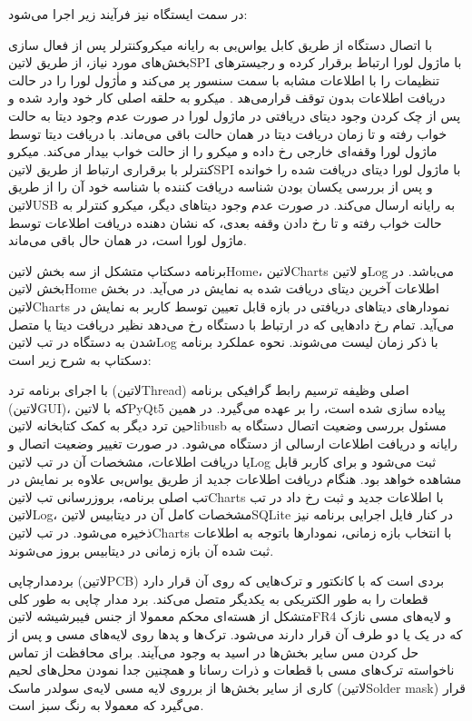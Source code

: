 در سمت ایستگاه نیز فرآیند زیر اجرا می‌شود:

با اتصال دستگاه از طریق کابل یو‌اس‌بی به رایانه میکروکنترلر پس از فعال سازی بخش‌های مورد نیاز، از طریق ‌لاتین{SPI} با ماژول لورا ارتباط برقرار کرده و رجیستر‌های تنظیمات را با اطلاعات مشابه با سمت سنسور پر می‌کند و ماٰژول لورا را در حالت دریافت اطلاعات بدون توقف قرار‌می‌هد .
میکرو به حلقه اصلی کار خود وارد شده و پس از چک کردن وجود دیتای دریافتی در ماژول لورا در صورت عدم وجود دیتا به حالت خواب رفته و تا زمان دریافت دیتا در همان حالت باقی می‌ماند.
با دریافت دیتا توسط ماژول لورا وقفه‌ای خارجی رخ داده و میکرو را از حالت خواب بیدار می‌کند.
میکرو کنترلر با برقراری ارتباط از طریق ‌لاتین{SPI} با ماژول لورا دیتای دریافت شده را خوانده و پس از بررسی یکسان بودن شناسه دریافت کننده با شناسه خود آن را از طریق ‌لاتین{USB} به رایانه ارسال می‌کند.
در صورت عدم وجود دیتا‌های دیگر، میکرو کنترلر به حالت خواب رفته و تا رخ دادن وقفه بعدی، که نشان دهنده دریافت اطلاعات توسط ماژول لورا است، در همان حال باقی می‌ماند.

برنامه دسکتاپ متشکل از سه بخش ‌لاتین{Home}، ‌لاتین{Charts} و ‌لاتین{Log} می‌باشد. در بخش ‌لاتین{Home} اطلاعات آخرین دیتای دریافت شده به نمایش در می‌آید. در بخش ‌لاتین{Charts} نمودارهای دیتا‌های دریافتی در بازه قابل تعیین توسط کاربر به نمایش در می‌آید. تمام رخ داد‌هایی که در ارتباط با دستگاه رخ می‌دهد نظیر دریافت دیتا یا متصل شدن به دستگاه در تب ‌لاتین{Log} با ذکر زمان لیست می‌شوند. نحوه عملکرد برنامه دسکتاپ به شرح زیر است:

با اجرای برنامه ترد (‌لاتین{Thread}) اصلی وظیفه ترسیم رابط گرافیکی برنامه (‌لاتین{GUI})، که با ‌لاتین{PyQt5} پیاده سازی شده است، را بر عهده می‌گیرد.
در همین حین ترد دیگر به کمک کتابخانه ‌لاتین{libusb} مسئول بررسی وضعیت اتصال دستگاه به رایانه و دریافت اطلاعات ارسالی از دستگاه می‌شود.
در صورت تغییر وضعیت اتصال و یا دریافت اطلاعات، مشخصات آن در تب ‌لاتین{Log} ثبت می‌شود و برای کاربر قابل مشاهده خواهد بود.
هنگام دریافت اطلاعات جدید از طریق یو‌اس‌بی علاوه بر نمایش در تب اصلی برنامه، بروزرسانی تب ‌لاتین{Charts} با اطلاعات جدید و ثبت رخ داد در تب ‌لاتین{Log}، مشخصات کامل آن در دیتابیس ‌لاتین{SQLite} در کنار فایل اجرایی برنامه نیز ذخیره می‌شود. 
در تب ‌لاتین{Charts} با انتخاب بازه زمانی، نمودار‌ها باتوجه به اطلاعات ثبت شده آن بازه زمانی در دیتابیس بروز می‌شوند.


برد‌مدارچاپی (‌لاتین{PCB}) بردی است که با کانکتور و ترک‌هایی که روی آن قرار دارد قطعات را به طور الکتریکی به یکدیگر متصل می‌کند. برد مدار چاپی به طور کلی متشکل از هسته‌ای محکم معمولا از جنس فیبرشیشه ‌لاتین{FR4} و لایه‌های مسی نازک که در یک یا دو طرف آن قرار دارند می‌شود. ترک‌ها و پد‌ها روی لایه‌های مسی و پس از حل کردن مس سایر بخش‌ها در اسید به وجود می‌آیند. برای محافظت از تماس ناخواسته ترک‌های مسی با قطعات و ذرات رسانا و همچنین جدا نمودن محل‌های لحیم کاری از سایر بخش‌ها از برروی لایه مسی لایه‌ی سولدر ماسک (‌لاتین{Solder mask}) قرار می‌گیرد که معمولا به رنگ سبز است.

